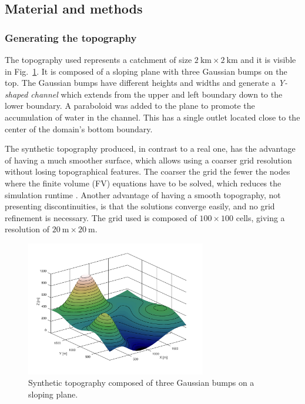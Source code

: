 \subsection{Material and methods}
\subsubsection{Generating the topography}

The topography used represents a catchment of size $\SI{2}{\kilo\meter} \times \SI{2}{\kilo\meter}$ and it is visible in Fig.~\ref{fig:topography}.
It is composed of a sloping plane with three Gaussian bumps on the top.
The Gaussian bumps have different heights and widths and generate a \emph{Y-shaped channel} which extends from the upper and left boundary down to the lower boundary.
A paraboloid was added to the plane to promote the accumulation of water in the channel.
This has a single outlet located close to the center of the domain's bottom boundary.

The synthetic topography produced, in contrast to a real one, has the advantage of having a much smoother surface, which allows using a coarser grid resolution without losing topographical features.
The coarser the grid the fewer the nodes where the finite volume (FV) equations have to be solved, which reduces the simulation runtime . 
Another advantage of having a smooth topography, not presenting discontinuities, is that the solutions converge easily, and no grid refinement is necessary.
The grid used is composed of $\num{100} \times \num{100}$ cells, giving a resolution of $\SI{20}{\meter} \times \SI{20}{\meter}.$

\begin{figure}[h]
  \centering
  \includegraphics[width=0.7\textwidth]{Figures/topography.png}
  \caption{Synthetic topography composed of three Gaussian bumps on a sloping plane.}
  \label{fig:topography}
\end{figure}

